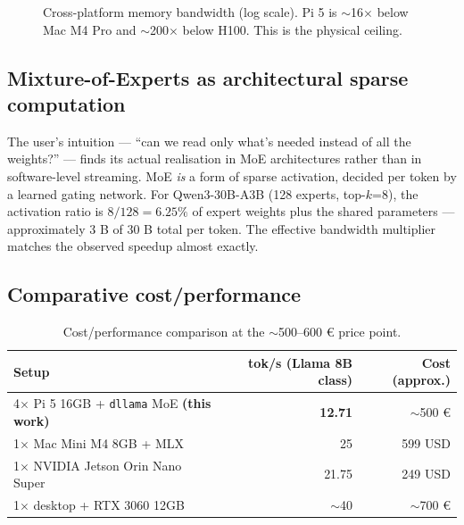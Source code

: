 \documentclass[11pt,a4paper]{article}
\begin{document}
\begin{figure}[H]
\centering
{}
\caption{Cross-platform memory bandwidth (log scale). Pi 5 is $\sim$16$\times$ below Mac M4 Pro and $\sim$200$\times$ below H100. This is the physical ceiling.}
\end{figure}

\subsection{Mixture-of-Experts as architectural sparse computation}
The user's intuition --- ``can we read only what's needed instead of all the weights?'' --- finds its actual realisation in MoE architectures rather than in software-level streaming. MoE \emph{is} a form of sparse activation, decided per token by a learned gating network. For Qwen3-30B-A3B (128 experts, top-$k$=8), the activation ratio is $8/128 = 6.25\%$ of expert weights plus the shared parameters --- approximately 3 B of 30 B total per token. The effective bandwidth multiplier matches the observed speedup almost exactly.

\subsection{Comparative cost/performance}

\begin{table}[H]
\centering
\caption{Cost/performance comparison at the $\sim$500--600 \euro{} price point.}
\begin{tabular}{lrr}
\toprule
\textbf{Setup} & \textbf{tok/s (Llama 8B class)} & \textbf{Cost (approx.)} \\
\midrule
4$\times$ Pi 5 16GB + \texttt{dllama} MoE \textbf{(this work)} & \textbf{12.71} & $\sim$500 \euro \\
1$\times$ Mac Mini M4 8GB + MLX & 25 & 599 USD \\
1$\times$ NVIDIA Jetson Orin Nano Super & 21.75 & 249 USD \\
1$\times$ desktop + RTX 3060 12GB & $\sim$40 & $\sim$700 \euro \\
\bottomrule
\end{tabular}
\end{table}
\end{document}
